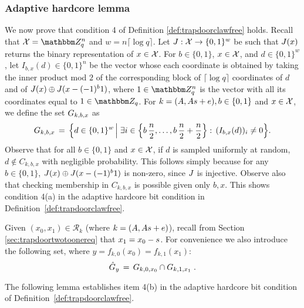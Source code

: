 \subsubsection{Adaptive hardcore lemma}
\label{sec:hc-lemma}
We now prove that condition 4 of Definition \ref{def:trapdoorclawfree} holds. 
Recall that $\sX=\mZ_q^n$ and $w=n\lceil \log q \rceil$. Let $J:\mathcal{X}\to\{0,1\}^w$  be such that $J(x)$ returns the binary representation of $x\in\mathcal{X}$. For $b\in\{0,1\}$, $x\in \mathcal{X}$, and $d\in\{0,1\}^w$, let
 $I_{b,x}(d) \in \{0,1\}^n$ be the vector whose each coordinate is obtained by taking the inner product mod $2$ of the corresponding block of $\lceil\log q\rceil$ coordinates of $d$ and of $\inj(x)\oplus \inj(x-(-1)^b\*1 )$, where $\*1 \in \mZ_q^n$ is the vector with all its coordinates equal to $1\in\mZ_q$. For $k = (\*A,\*A\*s + \*e), b\in\{0,1\}$ and $x\in\mathcal{X}$, we define the set $G_{k,b,x}$ as 
$$ G_{k,b,x}\,=\,\Big\{d\in \{0,1\}^w\,\Big|\; \exists i\in\Big\{b\,\frac{n}{2},\ldots,b\,\frac{n}{2}+\frac{n}{2}\Big\}:\,(I_{b,x}(d))_i \neq 0 \Big\}.$$
Observe that for all $b\in \{0,1\}$ and $x\in \mathcal{X}$, if $d$ is sampled uniformly at random, $d\notin C_{k,b,x}$ with negligible probability. This follows simply because for any $b\in\{0,1\}$, $\inj(x)\oplus \inj(x-(-1)^b\*1)$ is non-zero, since $J$ is injective. Observe also that checking membership in $C_{k,b,x}$ is possible given only $b,x$. This shows condition 4(a) in the adaptive hardcore bit condition in Definition~\ref{def:trapdoorclawfree}.

Given $(x_0,x_1)\in\mathcal{R}_k$ (where $k = (\*A,\*A\*s + \*e)$), recall from Section \ref{sec:trapdoortwotoonereq} that $x_1 = x_0 - \*s$. For convenience we also introduce the following set, where $y=f_{k,0}(x_0)=f_{k,1}(x_1)$:
\begin{equation}\label{eq:def-hatc}
\hat{G}_{y}\,=\,G_{k,0,x_0}\cap G_{k,1,x_1}\;.
\end{equation}

The following lemma establishes item 4(b) in the adaptive hardcore bit condition of Definition~\ref{def:trapdoorclawfree}. 

